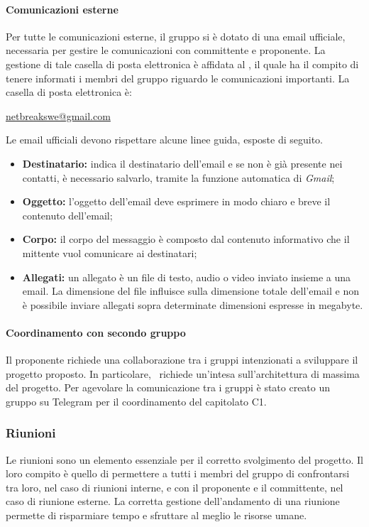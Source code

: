 			\paragraph{Comunicazioni esterne}
			Per tutte le comunicazioni esterne, il gruppo \textit{\gruppo} si è dotato di una email ufficiale, necessaria per gestire le comunicazioni con committente e proponente. La gestione di tale casella di posta elettronica è affidata al \textit{\RdP}, il quale ha il compito di tenere informati i membri del gruppo riguardo le comunicazioni importanti. La casella di posta elettronica è:
			\begin{center}
				\url{netbreakswe@gmail.com} 
			\end{center}
		Le email ufficiali devono rispettare alcune linee guida, esposte di seguito.
		\begin{itemize}
			\item \textbf{Destinatario:} indica il destinatario dell'email e se non è già presente nei contatti, è necessario salvarlo, tramite la funzione automatica di \textit{Gmail};
			\item \textbf{Oggetto:} l'oggetto dell'email deve esprimere in modo chiaro e breve il contenuto dell'email;
			\item \textbf{Corpo:} il corpo del messaggio è composto dal contenuto informativo che il mittente vuol comunicare ai destinatari;
			\item \textbf{Allegati:} un allegato è un file di testo, audio o video inviato insieme a una email. La dimensione del file influisce sulla dimensione totale dell'email e non è possibile inviare allegati sopra determinate dimensioni espresse in megabyte.
		\end{itemize}
		\paragraph{Coordinamento con secondo gruppo}
			Il proponente richiede una collaborazione tra i gruppi intenzionati a sviluppare il progetto proposto. In particolare, \proponente\ richiede un'intesa sull'architettura di massima del progetto. Per agevolare la comunicazione tra i gruppi è stato creato un gruppo su Telegram per il coordinamento del capitolato C1.
			
		\subsubsection{Riunioni}
		Le riunioni sono un elemento essenziale per il corretto svolgimento del progetto. Il loro compito è quello di permettere a tutti i membri del gruppo di confrontarsi tra loro, nel caso di riunioni interne, e con il proponente e il committente, nel caso di riunione esterne. La corretta gestione dell'andamento di una riunione permette di risparmiare tempo e sfruttare al meglio le risorse umane.
		
